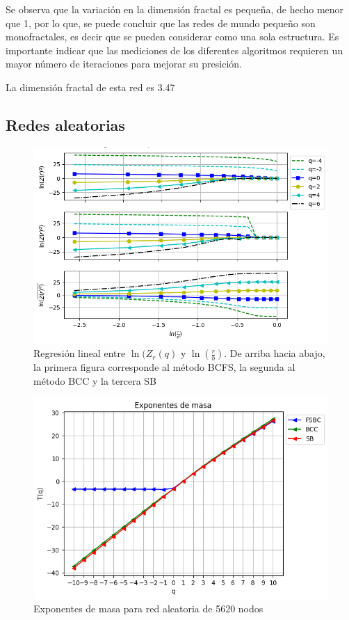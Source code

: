 Se observa que la variación en la dimensión fractal es pequeña, de hecho menor que 1, por lo que, se puede concluir que las redes de mundo pequeño son monofractales, es decir que se pueden considerar como una sola estructura. Es importante indicar que las mediciones de los diferentes algoritmos requieren un mayor número de iteraciones para mejorar su presición.

La dimensión fractal de esta red es 3.47

\subsection{Redes aleatorias}

\begin{figure}[H]
    \centering
    \includegraphics[scale=0.7]{Capitulo4Multifractalidad/imagenes/a_TqLnrBCrandom5620.png}
    \caption{Regresión lineal entre $\ln(Z_r(q)$ y $\ln(\frac{r}{b})$. De arriba hacia abajo, la primera figura corresponde al método BCFS, la segunda al método BCC y la tercera SB}
\end{figure}

\begin{figure}[H]
    \centering
    \includegraphics[scale=0.7]{Capitulo4Multifractalidad/imagenes/a_Tqrandom5620.png}
    \caption{Exponentes de masa para red aleatoria de 5620 nodos}
\end{figure}

